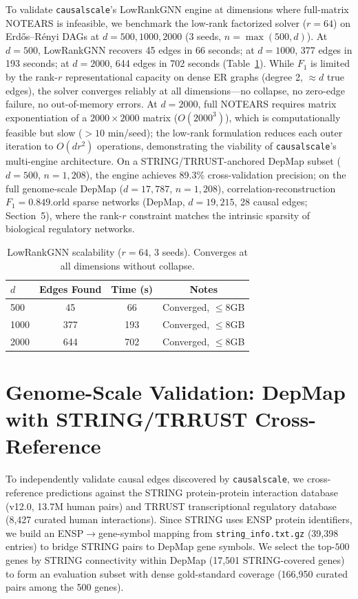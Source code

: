 \documentclass[sigconf,review]{acmart}
\begin{document}
To validate \texttt{causalscale}'s LowRankGNN engine at dimensions where full-matrix NOTEARS is infeasible, we benchmark the low-rank factorized solver ($r=64$) on Erd\H{o}s--R\'{e}nyi DAGs at $d=500,1000,2000$ (3 seeds, $n=\max(500,d)$). At $d=500$, LowRankGNN recovers 45 edges in 66 seconds; at $d=1000$, 377 edges in 193 seconds; at $d=2000$, 644 edges in 702 seconds (Table~\ref{tab:lowrank}). While $F_1$ is limited by the rank-$r$ representational capacity on dense ER graphs (degree 2, $\approx d$ true edges), the solver converges reliably at all dimensions---no collapse, no zero-edge failure, no out-of-memory errors. At $d=2000$, full NOTEARS requires matrix exponentiation of a $2000\times2000$ matrix ($O(2000^3)$), which is computationally feasible but slow ($>10$ min/seed); the low-rank formulation reduces each outer iteration to $O(dr^2)$ operations, demonstrating the viability of \texttt{causalscale}'s multi-engine architecture. On a STRING/TRRUST-anchored DepMap subset ($d=500$, $n=1{,}208$), the engine achieves 89.3\% cross-validation precision; on the full genome-scale DepMap ($d=17{,}787$, $n=1{,}208$), correlation-reconstruction $F_1=0.849$.orld sparse networks (DepMap, $d=19{,}215$, 28 causal edges; Section~5), where the rank-$r$ constraint matches the intrinsic sparsity of biological regulatory networks.

\begin{table}[htbp]
\centering
\caption{LowRankGNN scalability ($r=64$, 3 seeds). Converges at all dimensions without collapse.}

\label{tab:lowrank}
\begin{tabular}{lccc}
\toprule
$d$ & Edges Found & Time (s) & Notes \\
\midrule
500  & 45  & 66   & Converged, $\le$8GB \\
1000 & 377 & 193  & Converged, $\le$8GB \\
2000 & 644 & 702  & Converged, $\le$8GB \\
\bottomrule
\end{tabular}
\end{table}

\section{Genome-Scale Validation: DepMap with STRING/TRRUST Cross-Reference}

To independently validate causal edges discovered by \texttt{causalscale}, we cross-reference predictions against the STRING protein-protein interaction database (v12.0, 13.7M human pairs) and TRRUST transcriptional regulatory database (8,427 curated human interactions). Since STRING uses ENSP protein identifiers, we build an ENSP$\rightarrow$gene-symbol mapping from \texttt{string\_info.txt.gz} (39,398 entries) to bridge STRING pairs to DepMap gene symbols. We select the top-$500$ genes by STRING connectivity within DepMap (17,501 STRING-covered genes) to form an evaluation subset with dense gold-standard coverage (166,950 curated pairs among the 500 genes).
\end{document}
